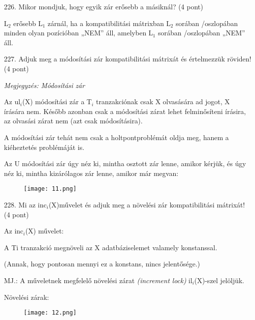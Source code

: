 \documentclass[a4paper,11.5pt, table]{article}
\begin{document}
226. Mikor mondjuk, hogy egyik zár erősebb a másiknál? (4 pont)
	\begin{compactitem}
		\item L$ _{2} $ erősebb L$ _{1} $ zárnál, ha a kompatibilitási mátrixban L$ _{2} $ sorában /oszlopában minden olyan pozícióban „NEM” áll, amelyben L$ _{1} $ sorában /oszlopában „NEM” áll. 
	\end{compactitem}

227. Adjuk meg a módosítási zár kompatibilitási mátrixát és értelmezzük röviden!(4 pont)
	\begin{compactitem}
		\item\textit{ Megjegyzés: Módosítási zár}
		\begin{compactitem}
			\item Az ul$ _{i} $(X) módosítási zár a T$ _{i} $ tranzakciónak csak X olvasására ad jogot, X írására nem. Később azonban csak a módosítási zárat lehet felminősíteni írásira, az olvasási zárat nem (azt csak módosításira). 
			\item A módosítási zár tehát nem csak a holtpontproblémát oldja meg, hanem a kiéheztetés problémáját is.			
		\end{compactitem}
		\item Az U módosítási zár úgy néz ki, mintha osztott zár lenne, amikor kérjük, és úgy néz ki, mintha kizárólagos zár lenne, amikor már megvan: 
		\begin{figure}[h]
			\centering
			\texttt{[image: 11.png]}
		\end{figure}
	\end{compactitem}

228. Mi az inc$ _{i} $(X)művelet és adjuk meg a növelési zár kompatibilitási mátrixát! (4 pont)
	\begin{compactitem}
		\item Az inc$ _{i} $(X) művelet:
		\begin{compactitem}
			\item A Ti tranzakció megnöveli az X adatbáziselemet valamely konstanssal. 
			\item (Annak, hogy pontosan mennyi ez a konstans, nincs jelentősége.)
		\end{compactitem}
		\item MJ.: A műveletnek megfelelő növelési zárat \textit{(increment lock)} il$ _{i} $(X)-szel jelöljük.
		\item Növelési zárak:
		\begin{figure}[h]
			\centering
			\texttt{[image: 12.png]}
		\end{figure}
	\end{compactitem}
\end{document}
